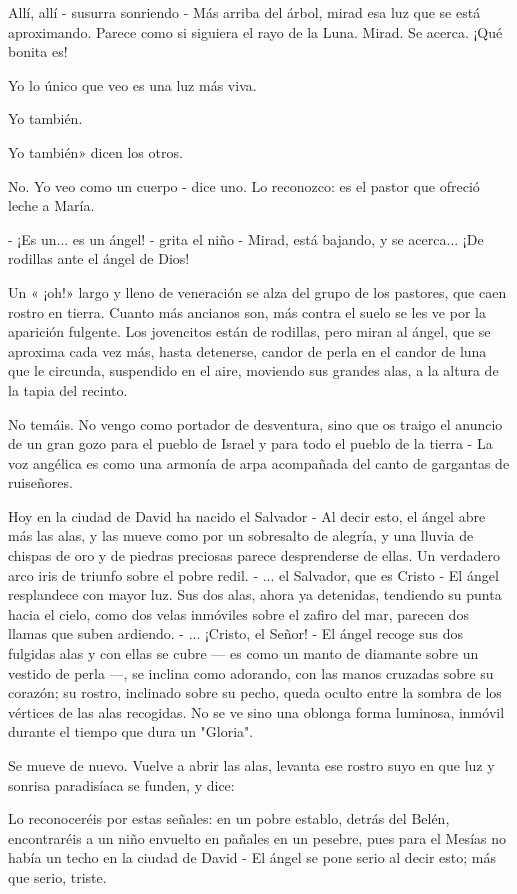 \documentclass[12pt]{book} %
\begin{document}
Allí, allí - susurra sonriendo - Más arriba del árbol, mirad esa luz que se está aproximando. Parece como si siguiera el rayo de la Luna. Mirad. Se acerca. ¡Qué bonita es! 

Yo lo único que veo es una luz más viva. 

Yo también. 

Yo también» dicen los otros. 

No. Yo veo como un cuerpo - dice uno. Lo reconozco: es el pastor que ofreció leche a María. 

- ¡Es un... es un ángel! - grita el niño - Mirad, está bajando, y se acerca... ¡De rodillas ante el ángel de Dios! 

Un « ¡oh!» largo y lleno de veneración se alza del grupo de los pastores, que caen rostro en tierra. Cuanto más ancianos son, más contra el suelo se les ve por la aparición fulgente. Los jovencitos están de rodillas, pero miran al ángel, que se aproxima cada vez más, hasta detenerse, candor de perla en el candor de luna que le circunda, suspendido en el aire, moviendo sus grandes alas, a la altura de la tapia del recinto. 

No temáis. No vengo como portador de desventura, sino que os traigo el anuncio de un gran gozo para el pueblo de Israel y para todo el pueblo de la tierra - La voz angélica es como una armonía de arpa acompañada del canto de gargantas de ruiseñores. 

Hoy en la ciudad de David ha nacido el Salvador - Al decir esto, el ángel abre más las alas, y las mueve como por un sobresalto de alegría, y una lluvia de chispas de oro y de piedras preciosas parece desprenderse de ellas. Un verdadero arco iris de triunfo sobre el pobre redil. - ... el Salvador, que es Cristo - El ángel resplandece con mayor luz. Sus dos alas, ahora ya detenidas, tendiendo su punta hacia el cielo, como dos velas inmóviles sobre el zafiro del mar, parecen dos llamas que suben ardiendo. - ... ¡Cristo, el Señor! - El ángel recoge sus dos fulgidas alas y con ellas se cubre — es como un manto de diamante sobre un vestido de perla —, se inclina como adorando, con las manos cruzadas sobre su corazón; su rostro, inclinado sobre su pecho, queda oculto entre la sombra de los vértices de las alas recogidas. No se ve sino una oblonga forma luminosa, inmóvil durante el tiempo que dura un "Gloria". 

Se mueve de nuevo. Vuelve a abrir las alas, levanta ese rostro suyo en que luz y sonrisa paradisíaca se funden, y dice: 

Lo reconoceréis por estas señales: en un pobre establo, detrás del Belén, encontraréis a un niño envuelto en pañales en un pesebre, pues para el Mesías no había un techo en la ciudad de David - El ángel se pone serio al decir esto; más que serio, triste. 
\end{document}
